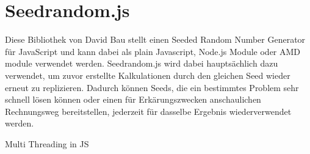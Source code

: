\section{Seedrandom.js}
Diese Bibliothek von David Bau stellt einen Seeded Random Number Generator für JavaScript und kann dabei als plain Javascript, Node.js Module oder AMD module verwendet werden. Seedrandom.js wird dabei hauptsächlich dazu verwendet, um zuvor erstellte Kalkulationen durch den gleichen Seed wieder erneut zu replizieren. Dadurch können Seeds, die ein bestimmtes Problem sehr schnell lösen können oder einen für Erkärungszwecken anschaulichen Rechnungsweg bereitstellen, jederzeit für dasselbe Ergebnis wiederverwendet werden.


Multi Threading in JS %

